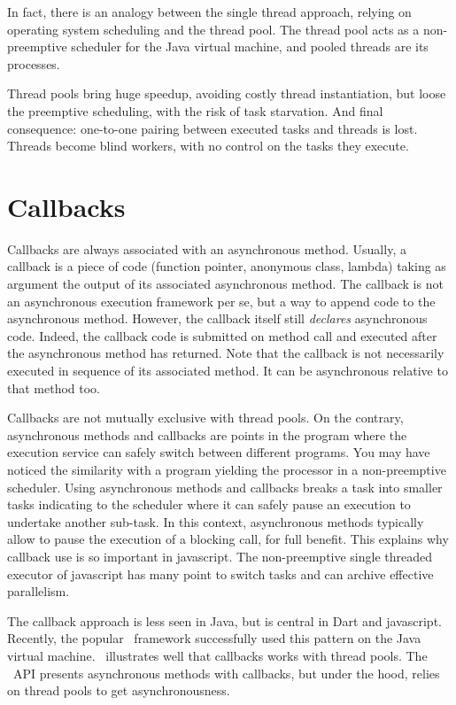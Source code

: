 In fact, there is an analogy between the single thread approach, relying on operating system scheduling and the thread pool. The thread pool acts as a non-preemptive scheduler for the Java virtual machine, and pooled threads are its processes.

Thread pools bring huge speedup, avoiding costly thread instantiation, but loose the preemptive scheduling, with the risk of task starvation.
And final consequence: one-to-one pairing between executed tasks and threads is lost. Threads become blind workers, with no control on the tasks they execute.

\section{Callbacks}

Callbacks are always associated with an asynchronous method. Usually, a callback is a piece of code (function pointer, anonymous class, lambda) taking as argument the output of its associated asynchronous method. The callback is not an asynchronous execution framework per se, but a way to append code to the asynchronous method. However, the callback itself still \emph{declares} asynchronous code. Indeed, the callback code is submitted on method call and executed after the asynchronous method has returned. Note that the callback is not necessarily executed in sequence of its associated method. It can be asynchronous relative to that method too.

Callbacks are not mutually exclusive with thread pools. On the contrary, asynchronous methods and callbacks are points in the program where the execution service can safely switch between different programs. You may have noticed the similarity with a program yielding the processor in a non-preemptive scheduler. Using asynchronous methods and callbacks breaks a task into smaller tasks indicating to the scheduler where it can safely pause an execution to undertake another sub-task. In this context, asynchronous methods typically allow to pause the execution of a blocking call, for full benefit. This explains why callback use is so important in javascript. The non-preemptive single threaded executor of javascript has many point to switch tasks and can archive effective parallelism.

The callback approach is less seen in Java, but is central in Dart and javascript. Recently, the popular \vertx\ framework successfully used this pattern on the Java virtual machine. \vertx\ illustrates well that callbacks works with thread pools. The \vertx\ API presents asynchronous methods with callbacks, but under the hood, relies on thread pools to get asynchronousness.

